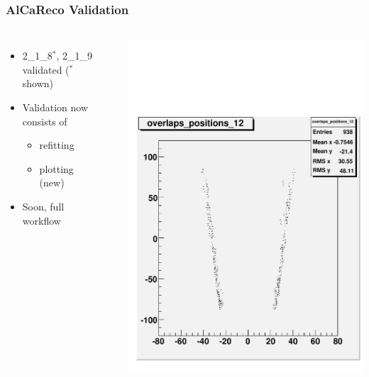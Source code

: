 \documentclass[compress]{beamer}
\begin{document}
\begin{frame}
\frametitle{AlCaReco Validation}
\small

\begin{columns}
\begin{itemize}
\item 2\_1\_8$^*$, 2\_1\_9 validated ($^*$shown)
\item Validation now consists of
\begin{itemize}
\item refitting
\item plotting (new)
\end{itemize}
\item Soon, full workflow
\end{itemize}

\vspace{-0.2 cm}
\mbox{ }

\includegraphics[width=\linewidth]{example_positions.pdf}


\end{columns}
\end{frame}
\end{document}
